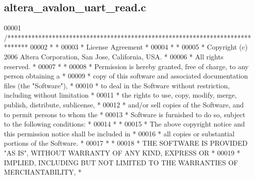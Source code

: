 \subsection{altera\+\_\+avalon\+\_\+uart\+\_\+read.\+c}
\label{altera__avalon__uart__read_8c_source}

\begin{DoxyCode}
00001 \textcolor{comment}{/******************************************************************************}
00002 \textcolor{comment}{*                                                                             *}
00003 \textcolor{comment}{* License Agreement                                                           *}
00004 \textcolor{comment}{*                                                                             *}
00005 \textcolor{comment}{* Copyright (c) 2006 Altera Corporation, San Jose, California, USA.           *}
00006 \textcolor{comment}{* All rights reserved.                                                        *}
00007 \textcolor{comment}{*                                                                             *}
00008 \textcolor{comment}{* Permission is hereby granted, free of charge, to any person obtaining a     *}
00009 \textcolor{comment}{* copy of this software and associated documentation files (the "Software"),  *}
00010 \textcolor{comment}{* to deal in the Software without restriction, including without limitation   *}
00011 \textcolor{comment}{* the rights to use, copy, modify, merge, publish, distribute, sublicense,    *}
00012 \textcolor{comment}{* and/or sell copies of the Software, and to permit persons to whom the       *}
00013 \textcolor{comment}{* Software is furnished to do so, subject to the following conditions:        *}
00014 \textcolor{comment}{*                                                                             *}
00015 \textcolor{comment}{* The above copyright notice and this permission notice shall be included in  *}
00016 \textcolor{comment}{* all copies or substantial portions of the Software.                         *}
00017 \textcolor{comment}{*                                                                             *}
00018 \textcolor{comment}{* THE SOFTWARE IS PROVIDED "AS IS", WITHOUT WARRANTY OF ANY KIND, EXPRESS OR  *}
00019 \textcolor{comment}{* IMPLIED, INCLUDING BUT NOT LIMITED TO THE WARRANTIES OF MERCHANTABILITY,    *}

\end{DoxyCode}
